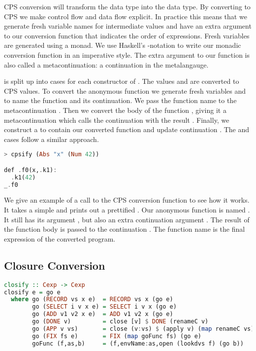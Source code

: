 {\ac{CPS} conversion will transform the  data type into the  data type. By converting to \ac{CPS} we make control flow and data flow explicit. In practice this means that we generate fresh variable names for intermediate values and have an extra argument to our conversion function that indicates the order of expressions. Fresh variables are generated using a monad. We use Haskell's -notation to write our monadic conversion function in an imperative style. The extra argument to our function is also called a metacontinuation: a continuation in the metalangauge.

 is split up into cases for each constructor of . The values  and  are converted to \ac{CPS} values. To convert the anonymous function  we generate fresh variables  and  to name the function and its continuation. We pass the function name to the metacontinuation . Then we convert the body of the function , giving it a metacontinuation which calls the continuation with the result . Finally, we construct a  to contain our converted function and update continuation . The  and  cases follow a similar approach.

\begin{lstlisting}[language=Haskell]
> cpsify (Abs "x" (Num 42))

def .f0(x,.k1):
  .k1(42)
_.f0
\end{lstlisting}

We give an example of a call to the \ac{CPS} conversion function to see how it works. It takes a simple  and prints out a prettified . Our anonymous function is named . It still has its argument , but also an extra continuation argument . The result of the function body is passed to the continuation . The function name is the final expression of the converted program.

\subsection{\label{section:closconvert}Closure Conversion}
\begin{lstlisting}[language=Haskell]
closify :: Cexp -> Cexp
closify e = go e
  where go (RECORD vs x e)  = RECORD vs x (go e)
        go (SELECT i v x e) = SELECT i v x (go e)
        go (ADD v1 v2 x e)  = ADD v1 v2 x (go e)
        go (DONE v)         = close [v] $ DONE (renameC v)
        go (APP v vs)       = close (v:vs) $ (apply v) (map renameC vs)
        go (FIX fs e)       = FIX (map goFunc fs) (go e)
        goFunc (f,as,b)     = (f,envName:as,open (lookdvs f) (go b))


\end{lstlisting}}
